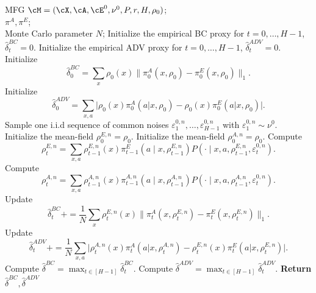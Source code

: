 \documentclass{article}
\theoremstyle{plain}
\begin{document}
\begin{algorithm}[hbp]
\caption{Proxy Algorithm}
\begin{algorithmic}[1]
\label{algo:proxy}
\REQUIRE MFG $\cM = (\cX, \cA, \cE^0, \nu^0, P, r, H, \rho_0)$; \\ 
\hspace{3.5em} $\pi^A, \pi^E$; \\
\hspace{3.5em} Monte Carlo parameter $N$;
\STATE Initialize the empirical BC proxy for $t = 0, \dots, H-1$, $\hat \delta^{BC}_t = 0$.
\STATE Initialize the empirical ADV proxy for $t = 0, \dots, H-1$, $\hat \delta^{ADV}_t = 0$.
\STATE Initialize $$\hat \delta^{BC}_0 = \sum_{x} \rho_0(x) \|\pi^A_0(x, \rho_0) - \pi^E_0(x, \rho_0)\|_1.$$
\STATE Initialize $$\hat \delta^{ADV}_0 =  \sum_{x, a} \rvert\rho_0(x)\pi^A_0(a\vert x, \rho_0) - \rho_0(x)\pi^E_0(a\vert x, \rho_0)\lvert.$$
    \STATE Sample one i.i.d sequence of common noises $\varepsilon^{0, n}_1, \dots, \varepsilon^{0, n}_{H-1}$ with $\varepsilon^{0, n}_1 \sim \nu^0$.
    \STATE Initialize the mean-field $\rho_0^{E,n} = \rho_0$.
    \STATE Initialize the mean-field $\rho_0^{A,n} = \rho_0$.
        \STATE Compute $$\rho_t^{E,n} = \sum_{x, a} \rho_{t-1}^{E,n}(x)\pi^E_{t-1}(a\mid x, \rho^{E,n}_{t-1}) P(\cdot\mid x, a, \rho^{E,n}_{t-1}, \varepsilon^{0,n}_t).$$
        \STATE Compute $$\rho_t^{A,n} = \sum_{x, a} \rho_{t-1}^{A,n}(x)\pi^{A,n}_{t-1}(a\mid x, \rho^{A,n}_{t-1}) P(\cdot\mid x, a, \rho^{A,n}_{t-1}, \varepsilon^{0,n}_t).$$
        \STATE Update $$\hat \delta^{BC}_t += \frac{1}{N} \sum_{x} \rho_t^{E,n}(x) \|\pi^A_t(x, \rho_t^{E,n}) - \pi^E_t(x, \rho_t^{E,n})\|_1.$$
        \STATE Update $$\hat \delta^{ADV}_t += \frac{1}{N} \sum_{x, a} \rvert\rho_t^{A,n}(x)\pi^A_t(a\vert x, \rho_t^{A,n}) - \rho_t^{E,n}(x)\pi^E_t(a\vert x, \rho_t^{E,n})\lvert.$$
    \ENDFOR
\ENDFOR
\STATE Compute $\hat \delta^{BC} = \max_{t \in [H-1]} \hat \delta^{BC}_t$.
\STATE Compute $\hat \delta^{ADV} = \max_{t \in [H-1]} \hat \delta^{ADV}_t$.
\STATE \textbf{Return} $\hat \delta^{BC}, \hat \delta^{ADV}$
\end{algorithmic}
\end{algorithm}
\end{document}
